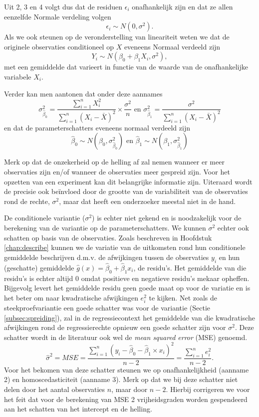 \documentclass[12pt,dutch,coursenotes]{book}
\theoremstyle{definition}
\theoremstyle{definition}
\theoremstyle{definition}
\theoremstyle{remark}
\begin{document}
Uit 2, 3 en 4 volgt dus dat de residuen \(\epsilon_i\) onafhankelijk
zijn en dat ze allen eenzelfde Normale verdeling volgen
\[\epsilon_i \sim N(0,\sigma^2).\] Als we ook steunen op de
veronderstelling van lineariteit weten we dat de originele observaties
conditioneel op \(X\) eveneens Normaal verdeeld zijn
\[Y_i\sim N(\beta_0+\beta_1 X_i,\sigma^2),\] met een gemiddelde dat
varieert in functie van de waarde van de onafhankelijke variabele
\(X_i\).

Verder kan men aantonen dat onder deze aannames
\[\sigma^2_{\hat{\beta}_0}=\frac{\sum\limits_{i=1}^n X^2_i}{\sum\limits_{i=1}^n (X_i-\bar X)^2} \times\frac{\sigma^2}{n} \text{ en } \sigma^2_{\hat{\beta}_1}=\frac{\sigma^2}{\sum\limits_{i=1}^n (X_i-\bar X)^2}\]
en dat de parameterschatters eveneens normaal verdeeld zijn
\[\hat\beta_0 \sim N\left(\beta_0,\sigma^2_{\hat \beta_0}\right) \text{ en } \hat\beta_1 \sim N\left(\beta_1,\sigma^2_{\hat \beta_1}\right)\]

Merk op dat de onzekerheid op de helling af zal nemen wanneer er meer
observaties zijn en/of wanneer de observaties meer gespreid zijn. Voor
het opzetten van een experiment kan dit belangrijke informatie zijn.
Uiteraard wordt de precisie ook beïnvloed door de grootte van de
variabiliteit van de observaties rond de rechte, \(\sigma^2\), maar dat
heeft een onderzoeker meestal niet in de hand.

De conditionele variantie (\(\sigma^2\)) is echter niet gekend en is
noodzakelijk voor de berekening van de variantie op de
parameterschatters. We kunnen \(\sigma^2\) echter ook schatten op basis
van de observaties. Zoals beschreven in Hoofdstuk \ref{chap:describe}
kunnen we de variatie van de uitkomsten rond hun conditionele gemiddelde
beschrijven d.m.v. de afwijkingen tussen de observaties \(y_i\) en hun
(geschatte) gemiddelde \(\hat{g}(x)=\hat{\beta}_0+\hat{\beta}_1x_i\), de
residu's. Het gemiddelde van die residu's is echter altijd 0 omdat
positieve en negatieve residu's mekaar opheffen. Bijgevolg levert het
gemiddelde residu geen goede maat op voor de variatie en is het beter om
naar kwadratische afwijkingen \(e_i^2\) te kijken. Net zoals de
steekproefvariantie een goede schatter was voor de variantie (Sectie
\ref{subsec:spreiding}), zal in de regressiecontext het gemiddelde van
die kwadratische afwijkingen rond de regressierechte opnieuw een goede
schatter zijn voor \(\sigma^2\). Deze schatter wordt in de literatuur
ook wel de \emph{mean squared error} (MSE) genoemd.
\[\hat\sigma^2=MSE=\frac{\sum\limits_{i=1}^n \left(y_i-\hat\beta_0-\hat\beta_1\times x_i\right)^2}{n-2}=\frac{\sum\limits_{i=1}^n e^2_i}{n-2}.\]
Voor het bekomen van deze schatter steunen we op onafhankelijkheid
(aanname 2) en homoscedasticiteit (aanname 3). Merk op dat we bij deze
schatter niet delen door het aantal observaties \(n\), maar door
\(n-2\). Hierbij corrigeren we voor het feit dat voor de berekening van
MSE 2 vrijheidsgraden worden gespendeerd aan het schatten van het
intercept en de helling.
\end{document}
